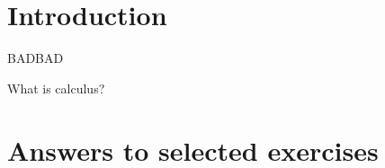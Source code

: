\documentclass[justified,marginals=raggedouter]{tufte-book}
\newcounter{exercise}
\begin{document}

\chapter*{Introduction}

BADBAD

What is calculus?

\mainmatter









%
%
%
%
%


\backmatter

%
%

\chapter*{Answers to selected exercises}


\printindex
\end{document}
